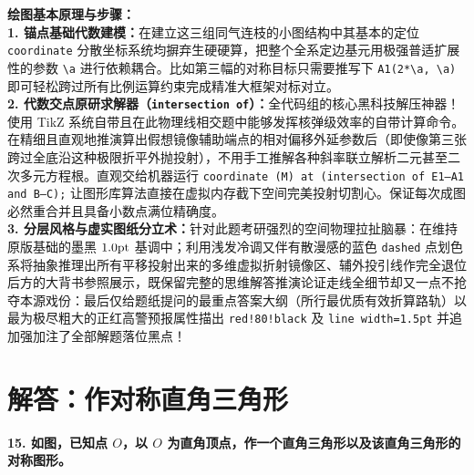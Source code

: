 {\small\color{blue!70!black}
\textbf{绘图基本原理与步骤：}\\
\textbf{1. 锚点基础代数建模：}在建立这三组同气连枝的小图结构中其基本的定位 \texttt{coordinate} 分散坐标系统均摒弃生硬硬算，把整个全系定边基元用极强普适扩展性的参数 \texttt{\textbackslash a} 进行依赖耦合。比如第三幅的对称目标只需要推写下 \texttt{A1(2*\textbackslash a, \textbackslash a)} 即可轻松跨过所有比例运算约束完成精准大框架对标对立。\\
\textbf{2. 代数交点原研求解器（\texttt{intersection of}）：}全代码组的核心黑科技解压神器！使用 TikZ 系统自带且在此物理线相交题中能够发挥核弹级效率的自带计算命令。在精细且直观地推演算出假想镜像辅助端点的相对偏移外延参数后（即使像第三张跨过全底沿这种极限折平外抛投射），不用手工推解各种斜率联立解析二元甚至二次多元方程根。直观交给机器运行 \texttt{coordinate (M) at (intersection of E1--A1 and B--C);} 让图形库算法直接在虚拟内存截下空间完美投射切割心。保证每次成图必然重合并且具备小数点满位精确度。\\
\textbf{3. 分层风格与虚实图纸分立术：}针对此题考研强烈的空间物理拉扯脑暴：在维持原版基础的墨黑 $1.0\rm{pt}$ 基调中；利用浅发冷调又伴有散漫感的蓝色 \texttt{dashed} 点划色系将抽象推理出所有平移投射出来的多维虚拟折射镜像区、辅外投引线作完全退位后方的大背书参照展示，既保留完整的思维解答推演论证走线全细节却又一点不抢夺本源戏份：最后仅给题纸提问的最重点答案大纲（所行最优质有效折算路轨）以最为极尽粗大的正红高警预报属性描出 \texttt{red!80!black} 及 \texttt{line width=1.5pt} 并追加强加注了全部解题落位黑点！
}

\newpage



\newpage

\section{解答：作对称直角三角形}

\vspace{0.6cm}

\textbf{15. 如图，已知点 $O$，以 $O$ 为直角顶点，作一个直角三角形以及该直角三角形的对称图形。}

\vspace{0.4cm}

